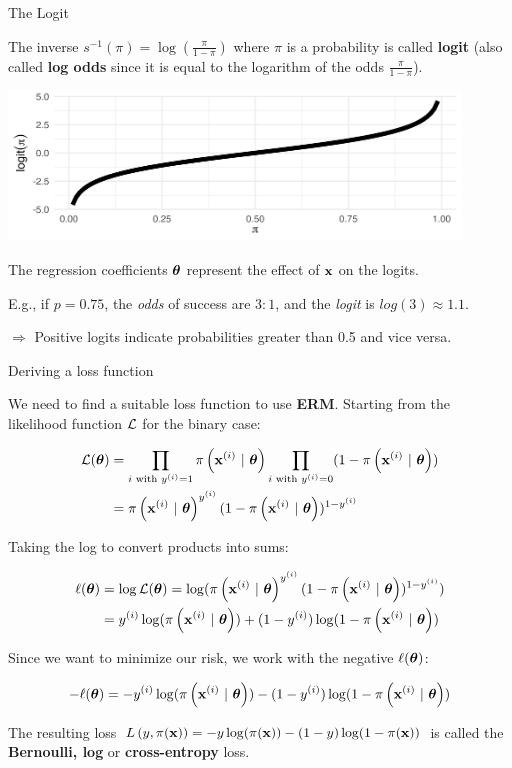 \documentclass[11pt,compress,t,notes=noshow, xcolor=table]{beamer}
\begin{document}
\begin{vbframe}{The Logit}

The inverse $s^{-1}(\pi) = \log\left(\frac{\pi}{1 - \pi}\right)$ where $\pi$ is a probability is called \textbf{logit} (also called \textbf{log odds} since it is equal to the logarithm of the odds $\frac{\pi}{1-\pi}$).

\begin{center}
\includegraphics[width=0.9\textwidth]{figure/logit_function.png}
\end{center}

The regression coefficients $\bm{\theta}$ represent the effect of $\mathbf{x}$ on the logits.

\lz

\small{E.g., if $p = 0.75$, the \textit{odds} of success are $3:1$, and the \textit{logit} is $log(3) \approx 1.1$.}

\vspace{1em}

$\Rightarrow$ Positive logits indicate probabilities greater than 0.5 and vice versa.
\end{vbframe}

\begin{vbframe}{Deriving a loss function}

We need to find a suitable loss function to use \textbf{ERM}. Starting from the likelihood function $\mathcal{L}$ for the binary case:
\begin{small}
\begin{align*}
\mathcal{L}(\bm{\theta}) &= \prod_{i \text{ with } y^{(i)} = 1} \pi\left(\mathbf{x}^{(i)} ~|~ \bm{\theta}\right) \prod_{i \text{ with } y^{(i)} = 0} (1-\pi\left(\mathbf{x}^{(i)} ~|~ \bm{\theta}\right)) \\
     &= \pi\left(\mathbf{x}^{(i)} ~|~ \bm{\theta}\right)^{y^{(i)}} (1-\pi\left(\mathbf{x}^{(i)} ~|~ \bm{\theta}\right))^{1-y^{(i)}}
\end{align*}
\end{small}
Taking the log to convert products into sums:
\begin{small}
\begin{align*}
\ell(\bm{\theta}) &= \log \mathcal{L}(\bm{\theta}) = \log(\pi\left(\mathbf{x}^{(i)} ~|~ \bm{\theta}\right)^{y^{(i)}} (1-\pi\left(\mathbf{x}^{(i)} ~|~ \bm{\theta}\right))^{1-y^{(i)}}) \\
       &= y^{(i)} \log(\pi\left(\mathbf{x}^{(i)} ~|~ \bm{\theta}\right)) + (1-y^{(i)})\log(1-\pi\left(\mathbf{x}^{(i)} ~|~ \bm{\theta}\right))
\end{align*}
\end{small}

Since we want to minimize our risk, we work with the negative $\ell(\bm{\theta})$:
\begin{small}
\begin{align*}
- \ell(\bm{\theta}) = - y^{(i)} \log(\pi\left(\mathbf{x}^{(i)} ~|~ \bm{\theta}\right)) - (1-y^{(i)})\log(1-\pi\left(\mathbf{x}^{(i)} ~|~ \bm{\theta}\right))
\end{align*}
\end{small}

The resulting loss $L\left(y, \pi(\mathbf{x})\right) = -y\log(\pi(\mathbf{x}))-(1-y)\log(1-\pi(\mathbf{x}))$ is called the \textbf{Bernoulli, log} or \textbf{cross-entropy} loss.

\end{vbframe}
\end{document}
